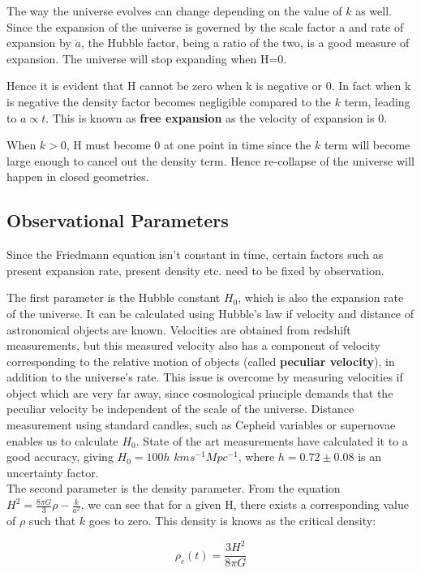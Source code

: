 \documentclass{article}
\begin{document}
The way the universe evolves can change depending on the value of $k$ as well. Since the expansion of the universe is governed by the scale factor a and rate of expansion by $\dot{a}$, the Hubble factor, being a ratio of the two, is a good measure of expansion. The universe will stop expanding when H=0. 

Hence it is evident that H cannot be zero when k is negative or 0. In fact when k is negative the density factor becomes negligible compared to the $k$ term, leading to $a \propto t$. This is known as \textbf{free expansion} as the velocity of expansion is 0.

When $k>0$, H must become 0 at one point in time since the $k$ term will become large enough to cancel out the density term. Hence re-collapse of the universe will happen in closed geometries.

\subsection{Observational Parameters}
Since the Friedmann equation isn't constant in time, certain factors such as present expansion rate, present density etc. need to be fixed by observation. 

The first parameter is the Hubble constant $H_0$, which is also the expansion rate of the universe. It can be calculated using Hubble's law if velocity and distance of astronomical objects are known. Velocities are obtained from redshift measurements, but this measured velocity also has a component of velocity corresponding to the relative motion of objects (called \textbf{peculiar velocity}), in addition to the universe's rate. This issue is overcome by measuring velocities if object which are very far away, since cosmological principle demands that the peculiar velocity be independent of the scale of the universe. Distance measurement using standard candles, such as Cepheid variables or supernovae enables us to calculate $H_0$. State of the art measurements have calculated it to a good accuracy, giving $H_0=100h$ $kms^{-1} Mpc^{-1}$, where $h=0.72\pm0.08$ is an uncertainty factor. \\

The second parameter is the density parameter. From the equation $H^2 = \frac{8{\pi}G}{3}\rho - \frac{k}{a^2}$, we can see that for a given H, there exists a corresponding value of $\rho$ such that $k$ goes to zero. This density is knows as the critical density:

\begin{equation}
    \rho_{c}(t) = \frac{3H^2}{8{\pi}G}
\end{equation}
\end{document}
